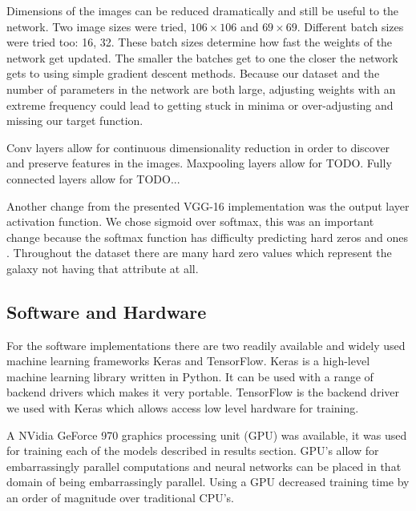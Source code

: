 Dimensions of the images can be reduced dramatically and still be useful to the network. Two image sizes were tried, $106 \times 106$ and $69 \times 69$. Different batch sizes were tried too: 16, 32. These batch sizes determine how fast the weights of the network get updated. The smaller the batches get to one the closer the network gets to using simple gradient descent methods. Because our dataset and the number of parameters in the network are both large, adjusting weights with an extreme frequency could lead to getting stuck in minima or over-adjusting and missing our target function.

Conv layers allow for continuous dimensionality reduction in order to discover and preserve features in the images. Maxpooling layers allow for TODO. Fully connected layers allow for TODO...

Another change from the presented VGG-16 implementation was the output layer activation function. We chose sigmoid over softmax, this was an important change because the softmax function has difficulty predicting hard zeros and ones \cite{kaggle-winner}. Throughout the dataset there are many hard zero values which represent the galaxy not having that attribute at all.

\subsection{Software and Hardware}\label{hard-soft-ware}
For the software implementations there are two readily available and widely used machine learning frameworks Keras and TensorFlow. Keras is a high-level machine learning library written in Python. It can be used with a range of backend drivers which makes it very portable. TensorFlow is the backend driver we used with Keras which allows access low level hardware for training.

A NVidia GeForce 970 graphics processing unit (GPU) was available, it was used for training each of the models described in results section. GPU's allow for embarrassingly parallel computations and neural networks can be placed in that domain of being embarrassingly parallel. Using a GPU decreased training time by an order of magnitude over traditional CPU's.
